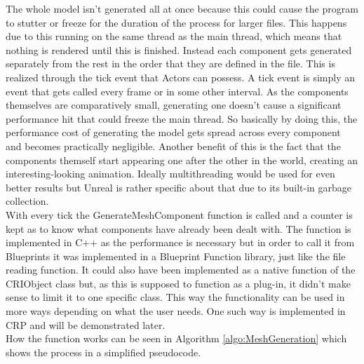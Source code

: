 The whole model isn't generated all at once because this could cause the program to stutter or freeze for the duration of the process for larger files. This happens due to this running on the same thread as the main thread, which means that nothing is rendered until this is finished. Instead each component gets generated separately from the rest in the order that they are defined in the file. This is realized through the tick event that Actors can possess. A tick event is simply an event that gets called every frame or in some other interval. As the components themselves are comparatively small, generating one doesn't cause a significant performance hit that could freeze the main thread. So basically by doing this, the performance cost of generating the model gets spread across every component and becomes practically negligible. Another benefit of this is the fact that the components themself start appearing one after the other in the world, creating an interesting-looking animation. Ideally multithreading would be used for even better results but Unreal is rather specific about that due to its built-in garbage collection\cite{}.\\
With every tick the GenerateMeshComponent function is called and a counter is kept as to know what components have already been dealt with. The function is implemented in C++ as the performance is necessary but in order to call it from Blueprints it was implemented in a Blueprint Function library, just like the file reading function. It could also have been implemented as a native function of the CRIObject class but, as this is supposed to function as a plug-in, it didn't make sense to limit it to one specific class. This way the functionality can be used in more ways depending on what the user needs. One such way is implemented in CRP and will be demonstrated later.\\
How the function works can be seen in Algorithm \ref{algo:MeshGeneration} which shows the process in a simplified pseudocode.

